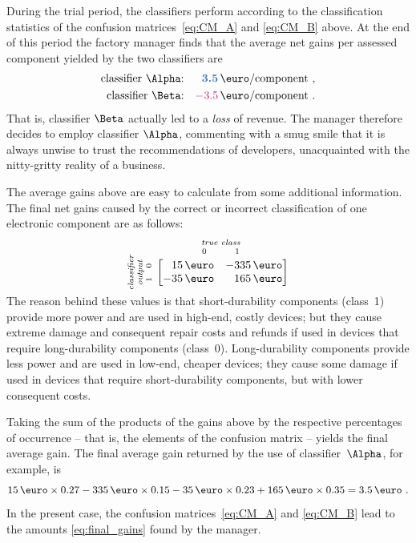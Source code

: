 \documentclass[\ifafour a4paper,12pt,\else a5paper,10pt,\fi%
onecolumn,oneside,article,%
british%
]{memoir}
\theoremstyle{remark}
\theoremstyle{innote}
\renewcommand*{\|}[1][]{\nonscript\:#1\vert\nonscript\:\mathopen{}}
\newcommand*{\good}[1]{\ensuremath{{\color{mypurpleblue}\bm{#1}}}}
\newcommand*{\bad}[1]{\ensuremath{{\color{myredpurple}#1}}}
\newcommand*{\umatrix}[4]{\begin{bmatrix*}[r]#1&#2\\#3&#4\end{bmatrix*}}
\begin{document}
During the trial period, the classifiers perform according to the classification statistics of the confusion matrices~\eqref{eq:CM_A} and \eqref{eq:CM_B} above. At the end of this period the factory manager finds that the average net gains per assessed component yielded by the two classifiers are
\begin{equation}
  \label{eq:final_gains}
\begin{aligned}
  \text{classifier $\Alpha$:}& & \good{3.5}\,\text{\texteuro/component}&\ , \\
  \text{classifier $\Beta$:}& &\bad{-3.5}\,\text{\texteuro/component}&\ .
\end{aligned}
\end{equation}
That is, classifier $\Beta$ actually led to a \emph{loss} of revenue. The manager therefore decides to employ classifier $\Alpha$, commenting with a smug smile that it is always unwise to trust the recommendations of developers, unacquainted with the nitty-gritty reality of a business.

The average gains above are easy to calculate from some additional information. The final net gains caused by the correct or incorrect classification of one electronic component are as follows:
\begin{equation}
  \label{eq:utility_example}
  \rotatebox[origin=c]{90}{
    \clap{\textit{\parbox{5em}{\centering\scriptsize classifier\\output\\$1\quad 0$}}
    }}\ 
    \overbracket[0pt]{
      \umatrix{
        15\,\text{\texteuro} }{ -335\,\text{\texteuro} }{
        -35\,\text{\texteuro} }{ 165\,\text{\texteuro}}
      }^{
      \clap{\textit{\parbox{6em}{\centering\scriptsize true class\\$0\hspace{3em}1$}}
    }}
\end{equation}
The reason behind these values is that short-durability components (class~1) provide more power and are used in high-end, costly devices; but they cause extreme damage and consequent repair costs and refunds if used in devices that require long-durability components (class~0). Long-durability components provide less power and are used in low-end, cheaper devices; they cause some damage if used in devices that require short-durability components, but with lower consequent costs.

Taking the sum of the products of the gains above by the respective percentages of occurrence -- that is, the elements of the confusion matrix -- yields the final average gain. The final average gain returned by the use of classifier~$\Alpha$, for example, is
\begin{equation*}
  15\,\text{\texteuro} \times 0.27 
  -335\,\text{\texteuro} \times 0.15 
  -35\,\text{\texteuro} \times 0.23 
  + 165\,\text{\texteuro} \times 0.35 =
  3.5 \,\text{\texteuro} \ .
\end{equation*}
In the present case, the confusion matrices~\eqref{eq:CM_A} and \eqref{eq:CM_B} lead to the amounts \eqref{eq:final_gains} found by the manager.
\end{document}
